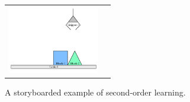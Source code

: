 \begin{figure}
\begin{center}
\begin{tabular}{cc}
\includegraphics[width=4cm]{gfx/blocks_world_example-7} &  
\end{tabular}
\end{center}
\caption[A storyboarded example of second-order learning.]{A
  storyboarded example of second-order learning.}
\label{figure:implemented_example_learning_storyboard}
\end{figure}
